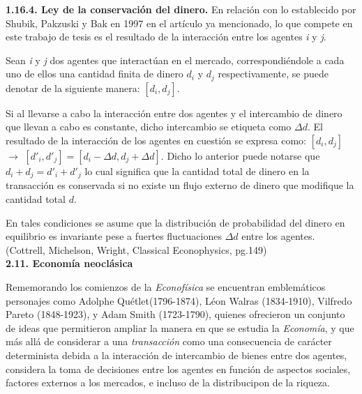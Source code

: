 {
\Large  \textbf{1.16.4. Ley de la conservación del dinero.} 
}
\newline
En relación con lo establecido por Shubik, Pakzuski y Bak en 1997 en el artículo ya mencionado, lo que compete en este trabajo de tesis es el resultado de la interacción entre los agentes \textit{i} y \textit{j}. 

Sean \textit{i} y \textit{j} dos agentes que interactúan en el mercado, correspondiéndole a cada uno de ellos una cantidad finita de dinero $d_{i}$ y $d_{j}$ respectivamente, se puede denotar de la siguiente manera: $[d_{i},d_{j}]$. 

Si al llevarse a cabo la interacción entre dos agentes y el intercambio de dinero que llevan a cabo es constante, dicho intercambio se etiqueta como $\Delta d$. El resultado de la interacción de los agentes en cuestión se expresa como:  $[d_{i},d_{j}]$ $\longrightarrow$  $[d'_{i},d'_{j}] = [d_{i} - \Delta d ,d_{j} + \Delta d]$. Dicho lo anterior puede notarse que $d_{i} + d_{j} = d'_{i} + d'_{j}$ lo cual significa que la cantidad total de dinero en la transacción es conservada si no existe un flujo externo de dinero que modifique la cantidad total $d$.

En tales condiciones se asume que la distribución de probabilidad del dinero en equilibrio es invariante pese a fuertes fluctuaciones $\Delta d$ entre los agentes. (Cottrell, Michelson, Wright, Classical Econophysics, pg.149)
\newline
\\


{
\Large  \textbf{2.11. Economía neoclásica} 
}

Rememorando los comienzos de la \textit{Econofísica} se encuentran emblemáticos personajes como Adolphe Quétlet(1796-1874), Léon Walras (1834-1910), Vilfredo Pareto (1848-1923), y Adam Smith (1723-1790), quienes ofrecieron un conjunto de ideas que permitieron ampliar la manera en que se estudia la \textit{Economía}, y que más allá de considerar a una \textit{transacción} como una consecuencia de carácter determinista debida a la interacción de intercambio de bienes entre dos agentes, considera la toma de decisiones entre los agentes en función de aspectos sociales, factores externos a los mercados, e incluso de la distribucipon de la riqueza.
\newline

